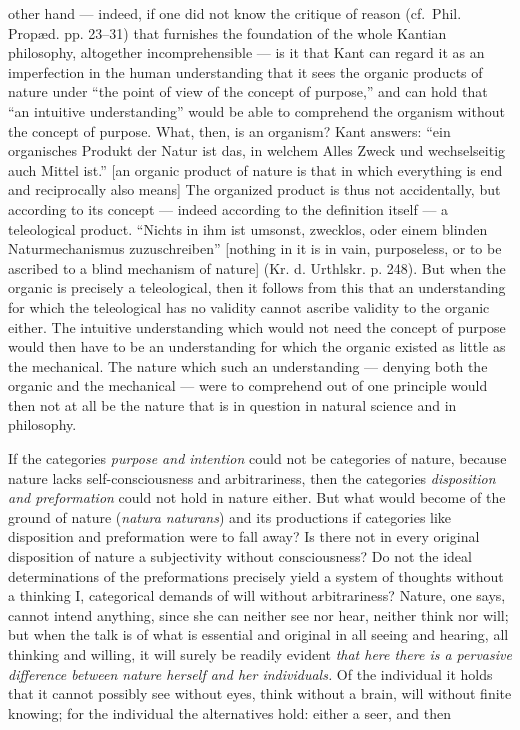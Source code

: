 \documentclass[12pt,a4paper]{book}
\begin{document}
other hand --- indeed, if one did not know the critique of reason
(cf.\ Phil. Propæd. pp. 23--31) that furnishes the foundation of the whole
Kantian philosophy, altogether incomprehensible --- is it that Kant can regard
it as an imperfection in the human understanding that it sees the organic
products of nature under ``the point of view of the concept of purpose,'' and can
hold that ``an intuitive understanding'' would be able to comprehend the organism
without the concept of purpose. What, then, is an organism? Kant answers: ``ein
organisches Produkt der
Natur ist das, in welchem Alles Zweck und wechselseitig auch Mittel ist.'' [an
organic product of nature is that in which everything is end and reciprocally
also means] The organized product is thus not accidentally, but according to its
concept --- indeed according to the definition itself --- a teleological product.
``Nichts in ihm ist umsonst, zwecklos, oder einem blinden Naturmechanismus
zuzuschreiben'' [nothing in it is in vain, purposeless, or to be ascribed to a
blind mechanism of nature] (Kr. d. Urthlskr. p. 248). But when the organic is
precisely a teleological, then it follows from this that an understanding for
which the teleological has no validity cannot ascribe validity to the organic
either. The intuitive understanding which would not need the concept of purpose
would then have to be an understanding for which the organic existed as little
as the mechanical. The nature which such an understanding --- denying both the
organic and the mechanical --- were to comprehend out of one principle would then
not at all be the nature that is in question in natural science and in
philosophy.

If the categories \emph{purpose and intention} could not be categories of
nature, because nature lacks self-consciousness and arbitrariness, then the
categories \emph{disposition and preformation} could not hold in nature either.
But what would become of the ground of nature (\textit{natura naturans}) and its
productions if categories like disposition and preformation were to fall away?
Is there not in every original disposition of nature a subjectivity without
consciousness? Do not the ideal determinations of the preformations precisely
yield a system of thoughts without a thinking I, categorical demands of will
without arbitrariness? Nature, one says, cannot intend anything, since she can
neither see nor hear, neither think nor will; but when the talk is of what is
essential and original in all seeing and hearing, all thinking and willing, it
will surely be readily evident \emph{that here there is a pervasive difference
between nature herself and her individuals.} Of the individual it holds that it
cannot possibly see without eyes, think without a brain, will without finite
knowing; for the individual the alternatives hold: either a seer, and then
\end{document}
